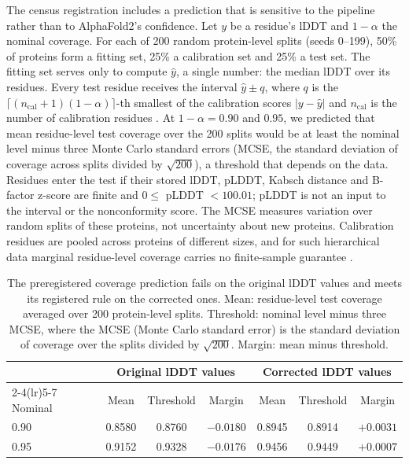 \documentclass{article}
\begin{document}
The census registration includes a prediction that is sensitive to the pipeline rather than to AlphaFold2's confidence. Let $y$ be a residue's lDDT and $1-\alpha$ the
nominal coverage. For each of 200 random protein-level splits (seeds
0--199), 50\% of proteins form a fitting set, 25\% a calibration set and
25\% a test set. The fitting set serves only to compute $\hat y$, a single
number: the median lDDT over its residues. Every test residue receives the
interval $\hat y \pm q$, where $q$ is the
$\lceil (n_{\mathrm{cal}}+1)(1-\alpha)\rceil$-th smallest of the calibration
scores $|y-\hat y|$ and $n_{\mathrm{cal}}$ is the number of calibration
residues \citep{vovk2005,lei2018}. At $1-\alpha = 0.90$ and $0.95$, we
predicted that mean residue-level test coverage over the 200 splits would be
at least the nominal level minus three Monte Carlo standard errors (MCSE,
the standard deviation of coverage across splits divided by $\sqrt{200}$),
a threshold that depends on the data. Residues enter the test if their stored lDDT, pLDDT, Kabsch distance and B-factor z-score are finite and $0 \le$ pLDDT $< 100.01$; pLDDT is not an input to the interval or the nonconformity score. The MCSE measures variation over random splits of these proteins, not uncertainty about new proteins. Calibration
residues are pooled across proteins of different sizes, and for such
hierarchical data marginal residue-level coverage carries no finite-sample
guarantee \citep{dunn2023,lee2023}.

\begin{table}[tbp]
\centering
\caption{The preregistered coverage prediction fails on the original lDDT values and meets its registered rule on the corrected ones. Mean: residue-level test coverage
averaged over 200 protein-level splits. Threshold: nominal level minus three
MCSE, where the MCSE (Monte Carlo standard error) is the standard deviation
of coverage over the splits divided by $\sqrt{200}$. Margin: mean minus
threshold.}
\label{tab:p5}
\begin{tabular}{lcccccc}
\toprule
 & \multicolumn{3}{c}{Original lDDT values} & \multicolumn{3}{c}{Corrected lDDT values}\\
\cmidrule(lr){2-4}\cmidrule(lr){5-7}
Nominal & Mean & Threshold & Margin & Mean & Threshold & Margin \\
\midrule
0.90 & 0.8580 & 0.8760 & $-0.0180$ & 0.8945 & 0.8914 & $+0.0031$ \\
0.95 & 0.9152 & 0.9328 & $-0.0176$ & 0.9456 & 0.9449 & $+0.0007$ \\
\bottomrule
\end{tabular}
\end{table}
\end{document}
